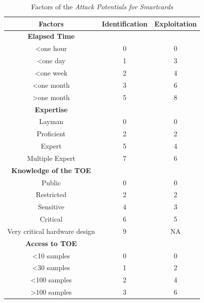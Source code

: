 \begin{table}[]
\centering
\caption{Factors of the \emph{Attack Potentials for Smartcards}}
\label{tab:cot_table}
\begin{tabular}{ccc}
\toprule
Factors                       & Identification & Exploitation \\
\midrule
\textbf{Elapsed Time}         &                &              \\
\textless one hour            & 0              & 0            \\
\textless one day             & 1              & 3            \\
\textless one week            & 2              & 4            \\
\textless one month           & 3              & 6            \\
\textgreater one month        & 5              & 8            \\
\midrule
\textbf{Expertise}            &                &              \\
Layman                        & 0              & 0            \\
Proficient                    & 2              & 2            \\
Expert                        & 5              & 4            \\
Multiple Expert               & 7              & 6            \\
\midrule
\textbf{Knowledge of the TOE} &                &              \\
Public                        & 0              & 0            \\
Restricted                    & 2              & 2            \\
Sensitive                     & 4              & 3            \\
Critical                      & 6              & 5            \\
Very critical hardware design & 9              & NA           \\
\midrule
\textbf{Access to TOE}        &                &              \\
\textless 10 samples          & 0              & 0            \\
\textless 30 samples          & 1              & 2            \\
\textless 100 samples         & 2              & 4            \\
\textgreater 100 samples      & 3              & 6            \\

\end{tabular}
\end{table}
